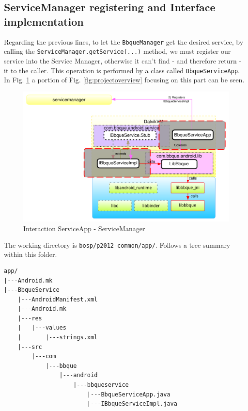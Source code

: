 \subsection{ServiceManager registering and Interface implementation}
Regarding the previous lines, to let the \texttt{BbqueManager} get the desired service, by calling the \texttt{ServiceManager.getService(...)} method, we must register our service into the Service Manager, otherwise it can't find - and therefore return - it to the caller. This operation is performed by a class called \texttt{BbqueServiceApp}. In Fig. \ref{fig:projectoverview_serviceapp} a portion of Fig. \ref{fig:projectoverview} focusing on this part can be seen.
\begin{figure}[!htb]
	\centering
	\includegraphics[scale=.505]{images/project_overview_IServiceImpl.pdf}
	\caption{Interaction ServiceApp - ServiceManager}
	\label{fig:projectoverview_serviceapp}
\end{figure}
The working directory is \texttt{bosp/p2012-common/app/}. Follows a tree summary within this folder.
\begin{verbatim}
app/
|---Android.mk
|---BbqueService
    |---AndroidManifest.xml
    |---Android.mk
    |---res
    |   |---values
    |       |---strings.xml
    |---src
        |---com
            |---bbque
                |---android
                    |---bbqueservice
                        |---BbqueServiceApp.java
                        |---IBbqueServiceImpl.java
\end{verbatim}
